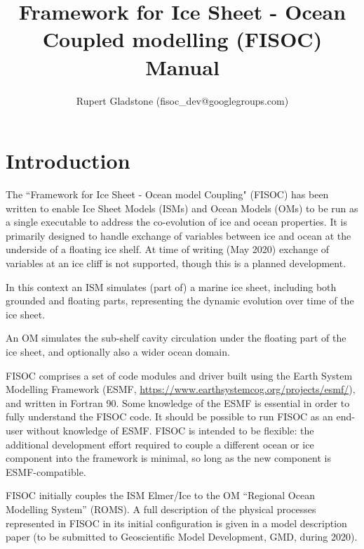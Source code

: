 \documentclass[11pt]{article}
\begin{document}
\title{Framework for Ice Sheet - Ocean Coupled modelling (FISOC) Manual}
\author{Rupert Gladstone (fisoc\_dev@googlegroups.com)}

\maketitle

\newpage 
\tableofcontents
\newpage 

\section{Introduction}

The ``Framework for Ice Sheet - Ocean model Coupling" (FISOC) has been written to enable Ice Sheet Models 
(ISMs) and Ocean Models (OMs) to be run as a single executable to address the co-evolution of ice and ocean 
properties.  
It is primarily designed to handle exchange of variables between ice and ocean at the underside of a floating ice shelf.
At time of writing (May 2020) exchange of variables at an ice cliff is 
not supported, though this is a planned development.

In this context an ISM simulates (part of) a marine ice sheet, including both grounded and floating parts, 
representing the dynamic evolution over time of the ice sheet.

An OM simulates the sub-shelf cavity circulation under the floating part of the ice sheet, and optionally also 
a wider ocean domain.

FISOC comprises a set of code modules and driver built using the Earth System Modelling Framework (ESMF, 
\url{https://www.earthsystemcog.org/projects/esmf/}), and written in Fortran 90. 
Some knowledge of the ESMF is essential in order to fully understand the FISOC code.  It should 
be possible to run FISOC as an end-user without knowledge of ESMF.
FISOC is intended to be flexible: the additional development effort required to 
couple a different ocean or ice component into the framework is minimal, so 
long as the new component is ESMF-compatible. 

FISOC initially couples the ISM Elmer/Ice to the OM ``Regional Ocean Modelling System'' (ROMS).
A full description of the physical processes represented in FISOC in its 
initial configuration is given in a model description paper (to be submitted
to Geoscientific Model Development, GMD, during 2020).
\end{document}

